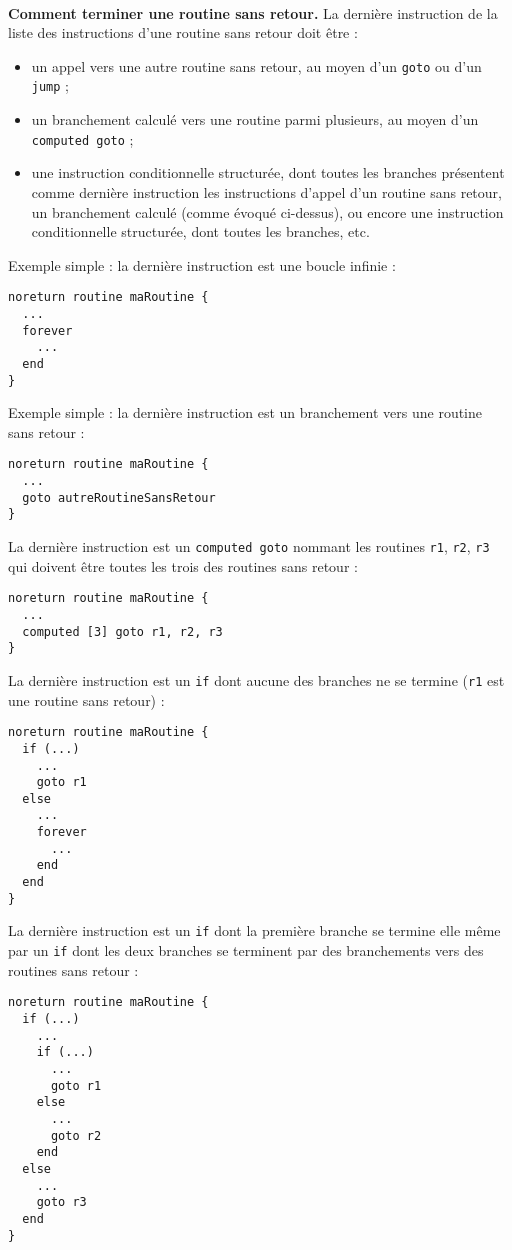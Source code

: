 ~\\
\textbf{Comment terminer une routine sans retour.} La dernière instruction de la liste des instructions d’une routine sans retour doit être :
\begin{itemize}
  \item un appel vers une autre routine sans retour, au moyen d’un \texttt{goto} ou d'un \texttt{jump} ;
  \item un branchement calculé vers une routine parmi plusieurs, au moyen d’un \texttt{computed goto} ;
  \item une instruction conditionnelle structurée, dont toutes les branches présentent comme dernière instruction les instructions d’appel d’un routine sans retour, un branchement calculé (comme évoqué ci-dessus), ou encore une instruction conditionnelle structurée, dont toutes les branches, etc.

\end{itemize}

Exemple simple : la dernière instruction est une boucle infinie :
\begin{lstlisting}[language=piccolo]
noreturn routine maRoutine {
  ...
  forever
    ...
  end
}
\end{lstlisting}

Exemple simple : la dernière instruction est un branchement vers une routine sans retour :
\begin{lstlisting}[language=piccolo]
noreturn routine maRoutine {
  ...
  goto autreRoutineSansRetour
}
\end{lstlisting}

La dernière instruction est un \texttt{computed goto} nommant les routines \texttt{r1}, \texttt{r2}, \texttt{r3} qui doivent être toutes les trois des routines sans retour :
\begin{lstlisting}[language=piccolo]
noreturn routine maRoutine {
  ...
  computed [3] goto r1, r2, r3
}
\end{lstlisting}

La dernière instruction est un \texttt{if} dont aucune des branches ne se termine (\texttt{r1} est une routine sans retour) :
\begin{lstlisting}[language=piccolo]
noreturn routine maRoutine {
  if (...)
    ...
    goto r1
  else
    ...
    forever
      ...
    end
  end
}

\end{lstlisting}


La dernière instruction est un \texttt{if} dont la première branche se termine elle même par un \texttt{if} dont les deux branches se terminent par des branchements vers des routines sans retour :
\begin{lstlisting}[language=piccolo]
noreturn routine maRoutine {
  if (...)
    ...
    if (...)
      ...
      goto r1
    else
      ...
      goto r2
    end
  else
    ...
    goto r3
  end
}
\end{lstlisting}








